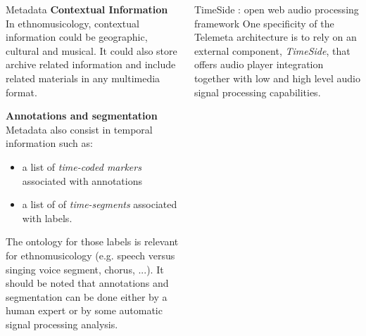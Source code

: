 \documentclass[final, hyperref, table]{beamer}
\begin{document}
\begin{frame}[containsverbatim]{}
\begin{columns}[t]
\begin{column}[T]{.49\linewidth}
\begin{block}{Metadata}
\textbf{Contextual Information}\\
In ethnomusicology, contextual information could be geographic, cultural and musical. It could also store archive related information and include related materials in any multimedia format. 

\textbf{Annotations and segmentation}\\
Metadata also consist in temporal information such as:
\begin{itemize}
\item a list of \emph{time-coded markers} associated with annotations
\item a list of of \emph{time-segments} associated with labels.
\end{itemize}
The ontology for those labels is relevant for ethnomusicology (e.g. speech versus singing voice segment, chorus, ...).
It should be noted that annotations and segmentation can be done either by a human expert or by some automatic signal processing analysis.

\end{block}
    \end{column}
   
\begin{column}[T]{.49\linewidth}
  \begin{block}{TimeSide : open web audio processing framework}
One specificity of the Telemeta architecture is to rely on an external component, \emph{TimeSide}, that offers audio player integration together with low and high level audio signal processing capabilities.


\end{block}
\end{column}
\end{columns}
\end{frame}
\end{document}
